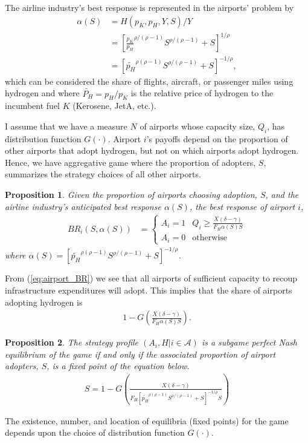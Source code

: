 \documentclass[a4paper, 14pt]{article}
\newtheorem{prop}{Proposition}
\begin{document}
The airline industry's best response is represented in the airports' problem by
\begin{align}
    \alpha(S) &= H(p_K, p_H, Y, S)/Y \nonumber \\
    &= \left[ \frac{p_K}{p_H}^{\rho/(\rho-1)} S^{\rho/(\rho-1)} + S \right]^{1/\rho} \nonumber \\
    &= \left[ \tilde{p_H}^{\rho(\rho-1)} S^{\rho/(\rho-1)} + S \right]^{-1/\rho}, \nonumber 
\end{align}
which can be considered the share of flights, aircraft, or passenger miles using hydrogen and where $\tilde{P_H} = p_H / p_K$ is the relative price of hydrogen to the incumbent fuel $K$ (Kerosene, JetA, etc.).

I assume that we have a measure $N$ of airports whose capacity size, $Q_i$, has distribution function $G(\cdot)$.
Airport $i$'s payoffs depend on the proportion of other airports that adopt hydrogen, but not on which airports adopt hydrogen.
Hence, we have aggregative game where the proportion of adopters, $S$, summarizes the strategy choices of all other airports.

\begin{prop}
Given the proportion of airports choosing adoption, $S$, and the airline industry's anticipated best response $\alpha(S)$, the best response of airport $i$,
\begin{align}
    BR_i(S, \alpha(S)) &= \begin{cases}
        A_i = 1 & Q_i \geq \frac{X(\delta - \gamma)}{F_H \alpha(S) S} \\
        A_i = 0 & \text{otherwise}
    \end{cases} \label{eq:airport_BR}
\end{align}
where $\alpha(S) = \left[ \tilde{p_H}^{\rho(\rho-1)} S^{\rho/(\rho-1)} + S \right]^{-1/\rho}$.
\end{prop}

From (\ref{eq:airport_BR}) we see that all airports of sufficient capacity to recoup infrastructure expenditures will adopt.
This implies that the share of airports adopting hydrogen is
\begin{align}
    1 - G\left(\frac{X(\delta - \gamma)}{F_H \alpha(S) S}\right). \nonumber
\end{align}

\begin{prop}
The strategy profile $(A_i, H | i\in \mathcal{A})$ is a subgame perfect Nash equilibrium of the game if and only if the associated proportion of airport adopters, $S$, is a fixed point of the equation below.
\begin{align}
    S = 1 - G\left(\frac{X(\delta - \gamma)}{F_H \left[ \tilde{p_H}^{\rho(\rho-1)} S^{\rho/(\rho-1)} + S \right]^{-1/\rho} S}\right) \label{eq:FP_equation}
\end{align}
\end{prop}
The existence, number, and location of equilibria (fixed points) for the game depends upon the choice of distribution function $G(\cdot)$.
\end{document}
